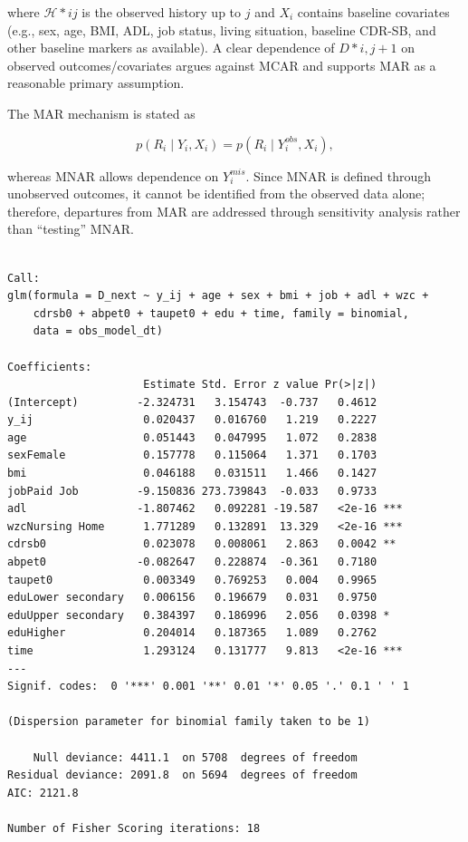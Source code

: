 \documentclass[
  11pt,
  letterpaper,
  DIV=11,
  numbers=noendperiod]{scrartcl}
\begin{document}
where \(\mathcal{H}*{ij}\) is the observed history up to \(j\) and
\(X_i\) contains baseline covariates (e.g., sex, age, BMI, ADL, job
status, living situation, baseline CDR-SB, and other baseline markers as
available). A clear dependence of \(D*{i,j+1}\) on observed
outcomes/covariates argues against MCAR and supports MAR as a reasonable
primary assumption.

The MAR mechanism is stated as

\[
p(R_i \mid Y_i, X_i)=p(R_i \mid Y_i^{obs}, X_i),
\]

whereas MNAR allows dependence on \(Y_i^{mis}\). Since MNAR is defined
through unobserved outcomes, it cannot be identified from the observed
data alone; therefore, departures from MAR are addressed through
sensitivity analysis rather than ``testing'' MNAR.

\begin{verbatim}

Call:
glm(formula = D_next ~ y_ij + age + sex + bmi + job + adl + wzc + 
    cdrsb0 + abpet0 + taupet0 + edu + time, family = binomial, 
    data = obs_model_dt)

Coefficients:
                     Estimate Std. Error z value Pr(>|z|)    
(Intercept)         -2.324731   3.154743  -0.737   0.4612    
y_ij                 0.020437   0.016760   1.219   0.2227    
age                  0.051443   0.047995   1.072   0.2838    
sexFemale            0.157778   0.115064   1.371   0.1703    
bmi                  0.046188   0.031511   1.466   0.1427    
jobPaid Job         -9.150836 273.739843  -0.033   0.9733    
adl                 -1.807462   0.092281 -19.587   <2e-16 ***
wzcNursing Home      1.771289   0.132891  13.329   <2e-16 ***
cdrsb0               0.023078   0.008061   2.863   0.0042 ** 
abpet0              -0.082647   0.228874  -0.361   0.7180    
taupet0              0.003349   0.769253   0.004   0.9965    
eduLower secondary   0.006156   0.196679   0.031   0.9750    
eduUpper secondary   0.384397   0.186996   2.056   0.0398 *  
eduHigher            0.204014   0.187365   1.089   0.2762    
time                 1.293124   0.131777   9.813   <2e-16 ***
---
Signif. codes:  0 '***' 0.001 '**' 0.01 '*' 0.05 '.' 0.1 ' ' 1

(Dispersion parameter for binomial family taken to be 1)

    Null deviance: 4411.1  on 5708  degrees of freedom
Residual deviance: 2091.8  on 5694  degrees of freedom
AIC: 2121.8

Number of Fisher Scoring iterations: 18
\end{verbatim}
\end{document}
